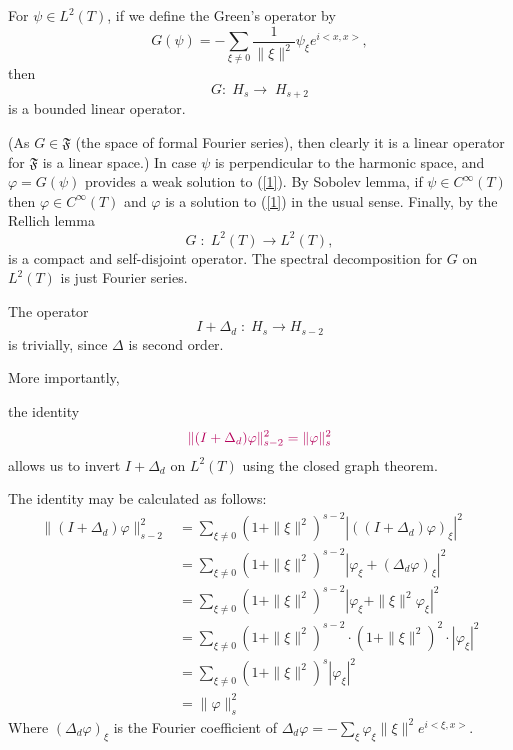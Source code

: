 \documentclass[twoside,openany,12pt]{beautynote}
\newcommand{\comma}{{,}}
\begin{document}
\begin{definition}
  For $\psi \in L^2 (T)$, if we define the Green's operator by
  \begin{equation}
    G (\psi) = - \sum_{\xi \neq 0} \frac{1}{\| \xi \|^2 } \psi_{\xi} e^{i < x
    \comma x >}, \label{2}
  \end{equation}
  then
  \[ G : \; H_s \longrightarrow \; H_{s + 2 } \]
  is a bounded linear operator. 
  
  {\color[HTML]{008080}} {\color[HTML]{008080}(As $G \in
  \mathfrak{F}$ (the space of formal Fourier series), then clearly it is a
  linear operator for $\mathfrak{F}$ is a linear space.)} In case
  {\color[HTML]{800080}$\psi$ is perpendicular to the harmonic
  space}{\color[HTML]{AA007F}, and $\varphi = G (\psi)$ provides a weak
  solution to (\ref{1}).} By Sobolev lemma, if $\psi \in C^{\infty} (T)$ then
  $\varphi \in C^{\infty} (T)$ and $\varphi$ is a solution to (\ref{1}) in the
  usual sense. Finally, by the Rellich lemma
  \[ G \; : \; L^2 (T) \longrightarrow L^2 (T), \]
  is a compact and self-disjoint operator. The spectral decomposition for $G$
  on $L^2 (T)$ is just Fourier series.
\end{definition}

The operator
\[ I + \Delta_d \; : \; H_s \longrightarrow H_{s - 2} \]
is trivially, since
{\color[HTML]{800080}$\Delta$ is second order}.

More importantly,

the identity
\[ {\color[HTML]{B4005A}\| (I + \Delta_d) \varphi \|_{s - 2}^2 =\| \varphi
   \|_s^2} \]
allows us to {\color[HTML]{800080}invert $I + \Delta_d$ on $L^2
(T)$} using {{\color[HTML]{800080}the closed graph theorem}}.

The identity may be calculated as follows:
\begin{align*}
  \| (I + \Delta_d) \varphi \|_{s - 2}^2 & =  \sum_{\xi \neq 0} (1 +\| \xi
  \|^2)^{s - 2} | ((I + \Delta_d ) \varphi)_{\xi} |^2\\
  & =  \sum_{\xi \neq 0} (1 +\| \xi \|^2)^{s - 2} | \varphi_{\xi} +
  (\Delta_d \varphi)_{\xi} |^2\\
  & =  \sum_{\xi \neq 0} (1 +\| \xi \|^2)^{s - 2} | \varphi_{\xi} +\| \xi
  \|^2 \varphi_{\xi} |^2\\
  & =  \sum_{\xi \neq 0} (1 +\| \xi \|^2)^{s - 2} \cdot (1 +\| \xi \|^2)^2
  \cdot | \varphi_{\xi} |^2\\
  & =  \sum_{\xi \neq 0} (1 +\| \xi \|^2)^s | \varphi_{\xi} |^2\\
  & =  \| \varphi \|^2_s
\end{align*}
Where $(\Delta_d \varphi)_{\xi}$ is the Fourier coefficient of $\Delta_d
\varphi = - \sum_{\xi} \varphi_{\xi} \| \xi \|^2 e^{i < \xi, x >}$.
\end{document}
